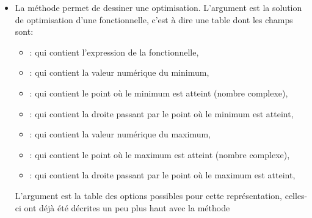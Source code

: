 \begin{itemize}
\begin{itemize}
\begin{itemize}
                \item {}, chaîne contenant les options pour le label, par défaut il est de la couleur de la droite, sur fond blanc transparent.
                
                \item {}, point d'ancrage du label, par défaut c'est le milieu de la droite (on peut utiliser aussi ).
                
                \item {}, sens d'écriture du label, par défaut c'est la direction de la droite.
                
                \item {}, position du label par rapport à son point d'ancrage, par défaut le label est placé de l'autre côté du polygone solution.
            \end{itemize}
    \end{itemize}
    
    \item La méthode  permet de dessiner une optimisation. L'argument  est la solution de optimisation d'une fonctionnelle, c'est à dire une table dont les champs sont:
    \begin{itemize}
        \item {} : qui contient l'expression de la fonctionnelle,
        \item {} : qui contient la valeur numérique du minimum,
        \item {} : qui contient le point où le minimum est atteint (nombre complexe),
        \item {} : qui contient la droite passant par le point où le minimum est atteint,
        \item {} : qui contient la valeur numérique du maximum,
        \item {} : qui contient le point où le maximum est atteint (nombre complexe),
        \item {} : qui contient la droite passant par le point où le maximum est atteint,
    \end{itemize}
    L'argument  est la table des options possibles pour cette représentation, celles-ci ont déjà été décrites un peu plus haut avec la méthode 
\end{itemize}

